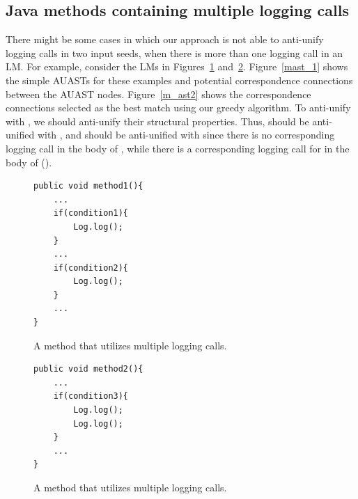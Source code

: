 

\subsection{Java methods containing multiple logging calls} \label{meth-multipleLogs}
There might be some cases in which our approach is not able to anti-unify logging calls in two input seeds, when there is more than one logging call in an LM. For example, consider the LMs in Figures~\ref{multiple1} and~\ref{multiple2}. Figure~\ref{mast_1} shows the simple AUASTs for these examples and potential correspondence connections between the AUAST nodes. Figure~\ref{m_ast2} shows the correspondence connections selected as the best match using our greedy algorithm. To anti-unify  with , we should anti-unify their structural properties. Thus,  should be anti-unified with , and  should be anti-unified with \NIL{} since there is no corresponding logging call in the body of , while there is a corresponding logging call for  in the body of  ().


\begin{figure}[t]
\def\baselinestretch{1}
\begin{lstlisting}
public void method1(){
	...
	if(condition1){
		Log.log();
	}
	...
	if(condition2){
		Log.log();
	}
	...
}
\end{lstlisting}
\caption{A  method that utilizes multiple logging calls.\label{multiple1}}
\end{figure}



\begin{figure}[H]
\def\baselinestretch{1}
\begin{lstlisting}
public void method2(){
	...
	if(condition3){
		Log.log();
		Log.log();
	}
	...
}
\end{lstlisting}
\caption{A  method that utilizes multiple logging calls.\label{multiple2}}
\end{figure}

